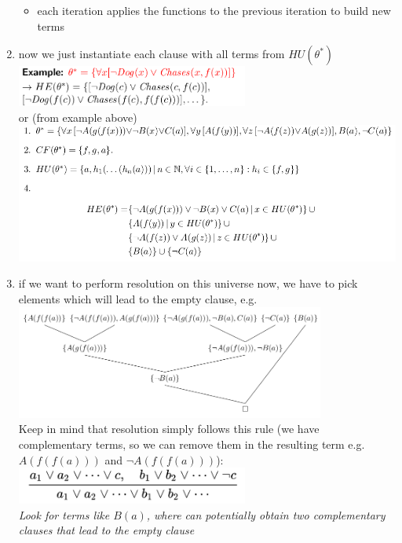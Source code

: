 \documentclass[conference]{styles/acmsiggraph}
\begin{document}
\begin{enumerate}
\begin{itemize}
        \item each iteration applies the functions to the previous iteration to build new terms
    \end{itemize} \vspace{40pt}
    \item now we just instantiate each clause with all terms from $HU({\theta}^*)$ \vspace{20pt} \\ 
    \includegraphics[width=0.6\textwidth]{imgs/expansion.png} \vspace{20pt} \\
    or (from example above) \vspace{20pt} \\
    \includegraphics[width=\textwidth]{imgs/expansion2.png} \vspace{40pt} \\
    \item if we want to perform resolution on this universe now, we have to pick elements which will lead to the empty clause, e.g. \\
    
    \includegraphics[width=0.8\textwidth]{imgs/resolution-tree.png}\\
    
    Keep in mind that resolution simply follows this rule (we have complementary terms, so we can remove them in the resulting term e.g. $A(f(f(a)))$ and $\neg A(f(f(a)))$):\\
    \includegraphics[width=0.6\textwidth]{imgs/resolution-rule.png} \\ %
    
    \textit{Look for terms like $B(a)$, where can potentially obtain two complementary clauses that lead to the empty clause}
    
    
    
\end{enumerate}
\end{document}
